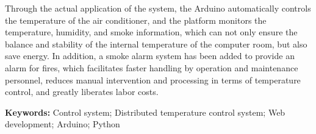 Through the actual application of the system, the Arduino automatically controls the temperature of the air conditioner, and the platform monitors the temperature, humidity, and smoke information, which can not only ensure the balance and stability of the internal temperature of the computer room, but also save energy. In addition, a smoke alarm system has been added to provide an alarm for fires, which facilitates faster handling by operation and maintenance personnel, reduces manual intervention and processing in terms of temperature control, and greatly liberates labor costs.

\vspace{1em}
\noindent 
\textbf{Keywords: }Control system; Distributed temperature control system; Web development; Arduino; Python

